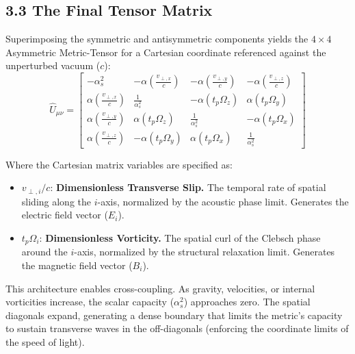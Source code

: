 \subsection*{3.3 The Final Tensor Matrix}
Superimposing the symmetric and antisymmetric components yields the $4 \times 4$ Asymmetric Metric-Tensor for a Cartesian coordinate referenced against the unperturbed vacuum ($c$):
\begin{equation}
\hat{U}_{\mu\nu} = \begin{bmatrix}
-\alpha_s^2 & -\alpha \left( \frac{v_{\perp, x}}{c} \right) & -\alpha \left( \frac{v_{\perp, y}}{c} \right) & -\alpha \left( \frac{v_{\perp, z}}{c} \right) \\[8pt]
\alpha \left( \frac{v_{\perp, x}}{c} \right) & \frac{1}{\alpha_s^2} & -\alpha(t_p \Omega_z) & \alpha(t_p \Omega_y) \\[8pt]
\alpha \left( \frac{v_{\perp, y}}{c} \right) & \alpha(t_p \Omega_z) & \frac{1}{\alpha_s^2} & -\alpha(t_p \Omega_x) \\[8pt]
\alpha \left( \frac{v_{\perp, z}}{c} \right) & -\alpha(t_p \Omega_y) & \alpha(t_p \Omega_x) & \frac{1}{\alpha_s^2}
\end{bmatrix} \label{eq:unified_matrix}
\end{equation}

\vspace{0.3cm}
Where the Cartesian matrix variables are specified as:
\begin{itemize}[noitemsep]
    \item $v_{\perp, i} / c$: \textbf{Dimensionless Transverse Slip.} The temporal rate of spatial sliding along the $i$-axis, normalized by the acoustic phase limit. Generates the electric field vector ($E_i$).
    \item $t_p \Omega_i$: \textbf{Dimensionless Vorticity.} The spatial curl of the Clebsch phase around the $i$-axis, normalized by the structural relaxation limit. Generates the magnetic field vector ($B_i$).
\end{itemize}

This architecture enables cross-coupling. As gravity, velocities, or internal vorticities increase, the scalar capacity ($\alpha_s^2$) approaches zero. The spatial diagonals expand, generating a dense boundary that limits the metric's capacity to sustain transverse waves in the off-diagonals (enforcing the coordinate limits of the speed of light).
\vspace{0.3cm}


